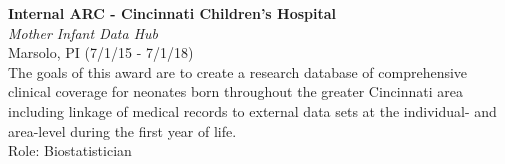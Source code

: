 \documentclass{nihbiosketch}
\begin{document}
\bigskip

\textbf{Internal ARC - Cincinnati Children's Hospital}\\
\emph{Mother Infant Data Hub}\\
Marsolo, PI (7/1/15 - 7/1/18)\\
The goals of this award are to create a research database of
comprehensive clinical coverage for neonates born throughout the greater
Cincinnati area including linkage of medical records to external data
sets at the individual- and area-level during the first year of life.\\
Role: Biostatistician
\end{document}
